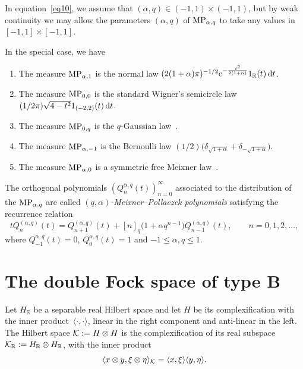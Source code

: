 \documentclass[pdftex]{sigma}
\numberwithin{equation}{section}
\def\R{{\mathbb R}}
\def\d{{\rm d}}
\def\qMP{{\rm MP}}
\def\HH{{\bf \mathcal K}}
\newcommand{\q}{q}
\newcommand{\s}{\alpha}%
\begin{document}
\begin{Remark}
In equation~\eqref{eq10}, we assume that $({\alpha,q})\in (-1,1)\times (-1,1)$, but
	by weak continuity we may allow the parameters $({\alpha,q})$ of $\qMP_{\alpha,q}$ to take any values	in $[-1,1]\times [-1,1]$.
\end{Remark}

\begin{Example}%
In the special case, we have
\begin{enumerate}\itemsep=0pt
		\item The measure $\qMP_{\alpha,1}$ is the normal law $(2(1+\alpha)\pi)^{-1/2}{\rm e}^{-\frac{t^2}{2(1+\alpha)}}1_\R(t)\,\d t$.
		
		\item The measure $\qMP_{0,0}$ is the standard Wigner's semicircle law $(1/2\pi)\sqrt{4-t^2}1_{(-2,2)}(t)\,\d t$.
		
		\item The measure $\qMP_{0,q}$ is the $q$-Gaussian law~\cite{BozejkoSpeicher1991}.
		
		\item The measure $\qMP_{\alpha,-1}$ is the Bernoulli law
		$(1/2)\big(\delta_{\sqrt{1+\alpha}}+\delta_{-\sqrt{1+\alpha}}\big)$.
		
		\item The measure $\qMP_{\alpha,0}$ is a symmetric free Meixner law~\cite{A03,BozejkoBryc2006,Ejsmont2013}.
	\end{enumerate}
\end{Example}

The orthogonal polynomials $(Q_n^{{\s,\q}}(t))_{n=0}^\infty$ associated to
the distribution of the
$\qMP_{\alpha,q}$ are called
\emph{$(\q,\s)$-Meixner--Pollaczek polynomials}
satisfying the recurrence relation
\begin{equation}\label{recursion}
	t Q_n^{(\s, \q)}(t) = Q_{n+1}^{(\s, \q)}(t) +[n]_q\big(1 + \s \q^{n-1}\big)Q_{n-1}^{(\s, \q)}(t), \qquad n=0,1,2,\dots,
\end{equation}
where $Q_{-1}^{{\s,\q}}(t)=0$, $Q_0^{{\s,\q}}(t)=1$ and $-1 \leq \s,\q \leq 1$.

\section{The double Fock space of type B}

Let $H_\R$ be a separable real Hilbert space and let $H$ be its
complexification with the inner product~$\langle\cdot,\cdot\rangle$, linear in the right component and anti-linear in the left.
The Hilbert space $\HH:=H\otimes {H}$ is the complexification of its
real subspace $\HH_\R:=H_\R\otimes {H}_\R$, with the inner product
\[
\langle x\otimes y,\xi\otimes \eta \rangle_{\HH} = \langle
x,\xi\rangle\langle y,\eta\rangle.
\]
\end{document}
